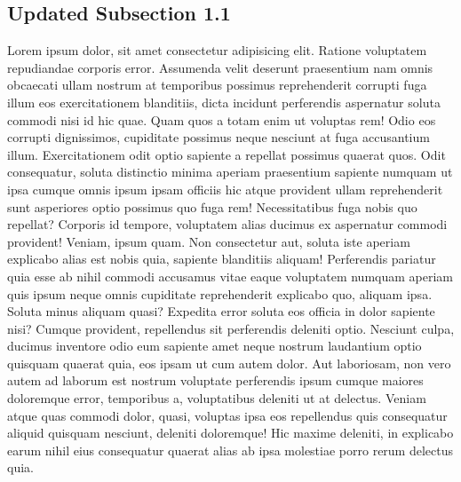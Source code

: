\documentclass[journal,lettersize]{IEEEtran}%
\begin{document}
%
\subsection{Updated Subsection 1.1}%
\label{subsec:UpdatedSubsection1.1}%
Lorem ipsum dolor, sit amet consectetur adipisicing elit. Ratione voluptatem repudiandae corporis error. Assumenda velit deserunt praesentium nam omnis obcaecati ullam nostrum at temporibus possimus reprehenderit corrupti fuga illum eos exercitationem blanditiis, dicta incidunt perferendis aspernatur soluta commodi nisi id hic quae. Quam quos a totam enim ut voluptas rem! Odio eos corrupti dignissimos, cupiditate possimus neque nesciunt at fuga accusantium illum. Exercitationem odit optio sapiente a repellat possimus quaerat quos. Odit consequatur, soluta distinctio minima aperiam praesentium sapiente numquam ut ipsa cumque omnis ipsum ipsam officiis hic atque provident ullam reprehenderit sunt asperiores optio possimus quo fuga rem! Necessitatibus fuga nobis quo repellat? Corporis id tempore, voluptatem alias ducimus ex aspernatur commodi provident! Veniam, ipsum quam. Non consectetur aut, soluta iste aperiam explicabo alias est nobis quia, sapiente blanditiis aliquam! Perferendis pariatur quia esse ab nihil commodi accusamus vitae eaque voluptatem numquam aperiam quis ipsum neque omnis cupiditate reprehenderit explicabo quo, aliquam ipsa. Soluta minus aliquam quasi? Expedita error soluta eos officia in dolor sapiente nisi? Cumque provident, repellendus sit perferendis deleniti optio. Nesciunt culpa, ducimus inventore odio eum sapiente amet neque nostrum laudantium optio quisquam quaerat quia, eos ipsam ut cum autem dolor. Aut laboriosam, non vero autem ad laborum est nostrum voluptate perferendis ipsum cumque maiores doloremque error, temporibus a, voluptatibus deleniti ut at delectus. Veniam atque quas commodi dolor, quasi, voluptas ipsa eos repellendus quis consequatur aliquid quisquam nesciunt, deleniti doloremque! Hic maxime deleniti, in explicabo earum nihil eius consequatur quaerat alias ab ipsa molestiae porro rerum delectus quia.
\end{document}
